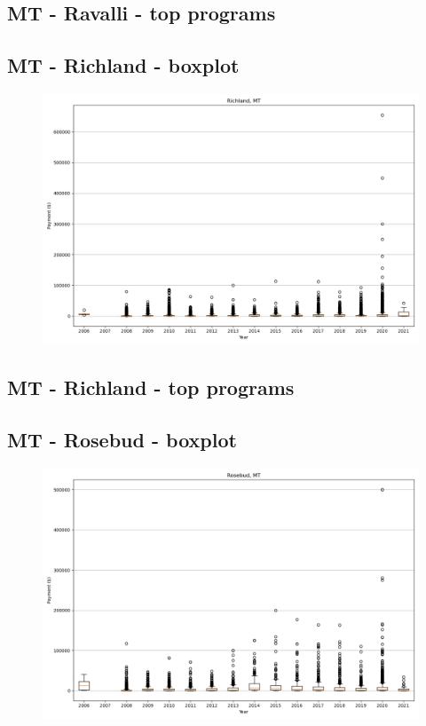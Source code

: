 \subsection*{MT - Ravalli - top programs}

\newpage
\subsection*{MT - Richland - boxplot}
\begin{figure}[h]
\centering
\includegraphics[width=7in]{../output/boxplots/counties/Richland-MT_boxplot.png}
\end{figure}


\subsection*{MT - Richland - top programs}

\newpage
\subsection*{MT - Rosebud - boxplot}
\begin{figure}[h]
\centering
\includegraphics[width=7in]{../output/boxplots/counties/Rosebud-MT_boxplot.png}
\end{figure}


